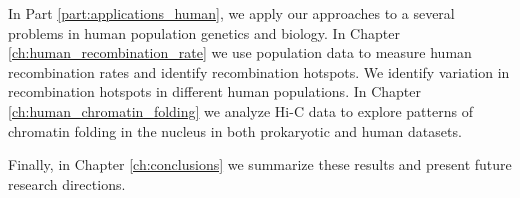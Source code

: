 In Part \ref{part:applications_human}, we apply our approaches to a several problems in human population genetics and biology.
In Chapter \ref{ch:human_recombination_rate} we use population data to measure human recombination rates and identify recombination hotspots.
We identify variation in recombination hotspots in different human populations.
In Chapter \ref{ch:human_chromatin_folding} we analyze Hi-C data to explore patterns of chromatin folding in the nucleus in both prokaryotic and human datasets.

Finally, in Chapter \ref{ch:conclusions} we summarize these results and present future research directions.